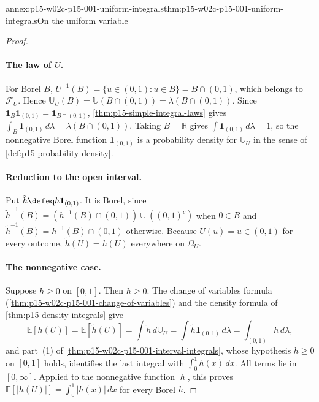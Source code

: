 \begin{annexitem}{annex:p15-w02c-p15-001-uniform-integrals}{thm:p15-w02c-p15-001-uniform-integrals}{On the uniform variable}
\begin{proof}
\paragraph{The law of \(U\).}
For Borel \(B\), \(U^{-1}(B)=\{u\in(0,1):u\in B\}=B\cap(0,1)\), which
belongs to \(\mathcal F_U\). Hence
\(\mathbb U_U(B)=\mathbb U(B\cap(0,1))=\lambda(B\cap(0,1))\). Since
\(\mathbf1_B\mathbf1_{(0,1)}=\mathbf1_{B\cap(0,1)}\),
\cref{thm:p15-simple-integral-laws} gives
\(\int_B\mathbf1_{(0,1)}\,d\lambda=\lambda(B\cap(0,1))\). Taking
\(B=\mathbb R\) gives \(\int\mathbf1_{(0,1)}\,d\lambda=1\), so the
nonnegative Borel function \(\mathbf1_{(0,1)}\) is a probability density
for \(\mathbb U_U\) in the sense of \cref{def:p15-probability-density}.

\paragraph{Reduction to the open interval.}
Put \(\tilde h\defeq h\mathbf1_{(0,1)}\). It is Borel, since
\(\tilde h^{-1}(B)=(h^{-1}(B)\cap(0,1))\cup((0,1)^c)\) when \(0\in B\)
and \(\tilde h^{-1}(B)=h^{-1}(B)\cap(0,1)\) otherwise. Because
\(U(u)=u\in(0,1)\) for every outcome, \(\tilde h(U)=h(U)\) everywhere
on \(\Omega_U\).

\paragraph{The nonnegative case.}
Suppose \(h\geq0\) on \([0,1]\). Then \(\tilde h\geq0\). The change of
variables formula (\cref{thm:p15-w02c-p15-001-change-of-variables}) and
the density formula of \cref{thm:p15-density-integrals} give
\[
 \mathbb E[h(U)]=\mathbb E[\tilde h(U)]
 =\int\tilde h\,d\mathbb U_U
 =\int\tilde h\mathbf1_{(0,1)}\,d\lambda
 =\int_{(0,1)}h\,d\lambda,
\]
and part~(1) of \cref{thm:p15-w02c-p15-001-interval-integrals}, whose
hypothesis \(h\geq0\) on \([0,1]\) holds, identifies the last integral
with \(\int_0^1h(x)\,dx\). All terms lie in \([0,\infty]\). Applied to the
nonnegative function \(|h|\), this proves
\(\mathbb E[|h(U)|]=\int_0^1|h(x)|\,dx\) for every Borel \(h\).


\end{proof}
\end{annexitem}
